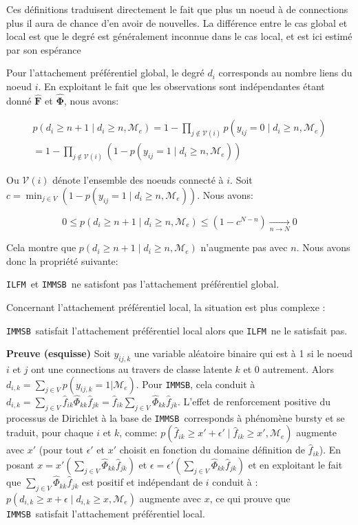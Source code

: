 \documentclass[french]{hermes-journal}
\newcommand{\ilfm}{\texttt{ILFM}}
\newcommand{\immsb}{\texttt{IMMSB}}
\newcommand{\pr}{p}
\newcommand{\mat}[1]{\bm{#1}}
\begin{document}
Ces définitions traduisent directement le fait que plus un noeud à de connections plus il aura de chance d'en avoir de nouvelles. La différence entre le cas global et local est que le degré est généralement inconnue dans le cas local, et est ici estimé par son espérance

Pour l'attachement préférentiel global, le degré $d_i$ corresponds au nombre liens du noeud $i$. En exploitant le fait que les observations sont indépendantes étant donné $\mat{\hat{F}}$ et $\mat{\hat{\Phi}}$, nous avons:


\begin{align}
\pr(d_{i} \ge n+1 \mid d_{i} \ge n, \mathcal{M}_e) = 1 - \prod_{j \notin \mathcal{V}(i)} p(y_{ij} = 0 \mid d_{i} \ge n, \mathcal{M}_e) \nonumber \\
= 1 - \prod_{j \notin \mathcal{V}(i)} (1 - p(y_{ij} = 1 \mid d_{i} \ge n, \mathcal{M}_e)) \nonumber
\end{align}

Ou $\mathcal{V}(i)$ dénote l'ensemble des noeuds connecté à $i$. Soit $c=\min_{j \in V}  (1-p(y_{ij} = 1 \mid d_{i} \ge n, \mathcal{M}_e))$. Nous avons:

\[
0 \le \pr(d_{i} \ge n+1 \mid d_{i} \ge n, \mathcal{M}_e) \le (1 - c^{N-n}) \xrightarrow[n \rightarrow N]{} 0
\]

Cela montre que $\pr(d_{i} \ge n+1 \mid d_{i} \ge n, \mathcal{M}_e)$ n'augmente pas avec $n$. Nous avons donc la propriété suivante:

\begin{proposition}[]
\label{pref-attch-glob}
\ilfm\ et \immsb\ ne satisfont pas l'attachement préférentiel global.
\end{proposition}

Concernant l'attachement préférentiel local, la situation est plus complexe :

\begin{proposition}[]
\label{pref-attch-loc}
\immsb\ satisfait l'attachement préférentiel local alors que \ilfm\ ne le satisfait pas.
\end{proposition}

\noindent \textbf{Preuve (esquisse)} Soit $y_{ij,k}$ une variable aléatoire binaire qui est à 1 si le noeud $i$ et $j$ ont une connections au travers de classe latente $k$ et 0 autrement.
Alors $d_{i,k} = \sum_{j \in V} \pr(y_{ij,k} =1 | \mathcal{M}_e)$.
Pour \immsb, cela conduit à $d_{i,k} = \sum_{j \in V} \hat{f}_{ik} \hat{\Phi}_{kk} \hat{f}_{jk} = \hat{f}_{ik} \sum_{j \in V} \hat{\Phi}_{kk} \hat{f}_{jk}$.
L'effet de renforcement positive du processus de Dirichlet \cite{HDP} à la base de \immsb\ corresponds à phénomène bursty et se traduit, pour chaque $i$ et $k$, comme: $\pr(\hat{f}_{ik} \ge x'+\epsilon' \mid \hat{f}_{ik} \ge x',\mathcal{M}_e)$ augmente avec  $x'$ (pour tout $\epsilon'$ et $x'$ choisit en fonction du domaine définition de  $\hat{f}_{ik}$).
En posant $x=x'(\sum_{j\in V} \hat{\Phi}_{kk} \hat{f}_{jk})$ et $\epsilon = \epsilon'(\sum_{j\in V} \hat{\Phi}_{kk} \hat{f}_{jk})$ et en exploitant le fait que $\sum_{j\in V} \hat{\Phi}_{kk} \hat{f}_{jk}$ est positif et indépendant de $i$ conduit à : $\pr(d_{i,k} \ge x+\epsilon \mid d_{i,k} \ge x, \mathcal{M}_e)$ augmente avec $x$, ce qui prouve que \immsb\ satisfait l'attachement préférentiel local.
\end{document}
